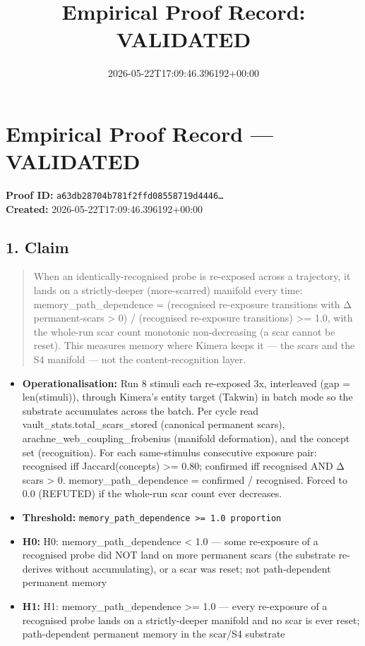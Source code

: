 \documentclass{article}
\title{Empirical Proof Record: VALIDATED}
\date{2026-05-22T17:09:46.396192+00:00}
\begin{document}
\maketitle
\section*{Empirical Proof Record --- \textcolor{validated}{\textbf{VALIDATED}}}
\textbf{Proof ID:} \texttt{a63db28704b781f2ffd08558719d4446\dots}\\
\textbf{Created:} 2026-05-22T17:09:46.396192+00:00
\subsection*{1. Claim}
\begin{quote}When an identically-recognised probe is re-exposed across a trajectory, it lands on a strictly-deeper (more-scarred) manifold every time: memory\_path\_dependence = (recognised re-exposure transitions with Δ permanent-scars > 0) / (recognised re-exposure transitions) >= 1.0, with the whole-run scar count monotonic non-decreasing (a scar cannot be reset). This measures memory where Kimera keeps it — the scars and the S4 manifold — not the content-recognition layer.\end{quote}
\begin{itemize}
\item \textbf{Operationalisation:} Run 8 stimuli each re-exposed 3x, interleaved (gap = len(stimuli)), through Kimera's entity target (Takwin) in batch mode so the substrate accumulates across the batch. Per cycle read vault\_stats.total\_scars\_stored (canonical permanent scars), arachne\_web\_coupling\_frobenius (manifold deformation), and the concept set (recognition). For each same-stimulus consecutive exposure pair: recognised iff Jaccard(concepts) >= 0.80; confirmed iff recognised AND Δ scars > 0. memory\_path\_dependence = confirmed / recognised. Forced to 0.0 (REFUTED) if the whole-run scar count ever decreases.
\item \textbf{Threshold:} \texttt{memory\_path\_dependence >= 1.0 proportion}
\item \textbf{H0:} H0: memory\_path\_dependence < 1.0 — some re-exposure of a recognised probe did NOT land on more permanent scars (the substrate re-derives without accumulating), or a scar was reset; not path-dependent permanent memory
\item \textbf{H1:} H1: memory\_path\_dependence >= 1.0 — every re-exposure of a recognised probe lands on a strictly-deeper manifold and no scar is ever reset; path-dependent permanent memory in the scar/S4 substrate
\end{itemize}
\end{document}
